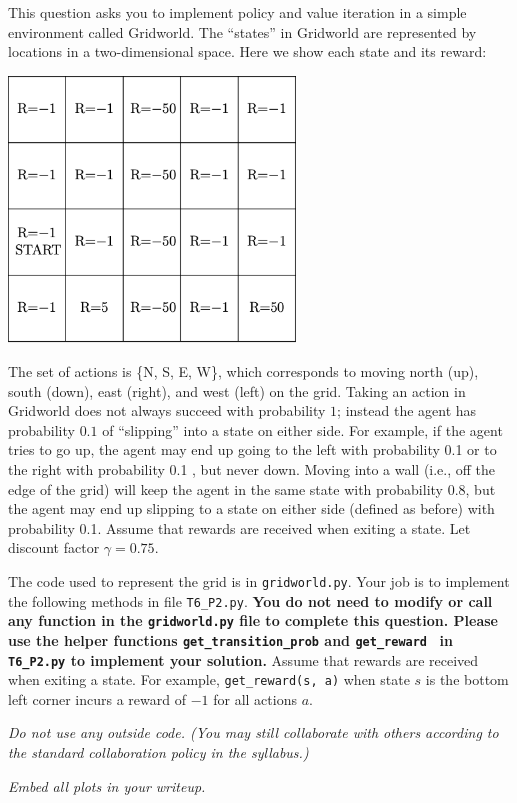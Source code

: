 \documentclass[submit]{harvardml}
\begin{document}
\begin{problem}

This question asks you to implement policy and value iteration in a
simple environment called Gridworld.  The ``states'' in Gridworld are
represented by locations in a two-dimensional space.  Here we show each state and its reward:

\begin{center}
\includegraphics[width=3in]{gridworld.png}
\end{center}

The set of actions is \{N, S, E, W\}, which corresponds to moving
north (up), south (down), east (right), and west (left) on the grid.
Taking an action in Gridworld does not always succeed with probability
$1$; instead the agent has probability $0.1$ of ``slipping'' into a
state on either side.  For example, if the agent tries to go up, the
agent may end up going to the left with probability 0.1 or
to the right
 with probability 0.1 , but never down.  Moving into a wall
(i.e., off the edge of the grid) will keep the agent in the same state
with probability  0.8, but
the agent may end up slipping to a state on either side (defined as before) with probability 0.1.  Assume that rewards are received when exiting a state. Let discount factor $\gamma = 0.75$.

The code used to represent the grid is in \texttt{gridworld.py}.  Your job is to implement the following methods in file \texttt{T6\_P2.py}. \textbf{You do not need to modify or call any function in the \texttt{gridworld.py} file to complete this question.  Please use the helper functions \texttt{get\_transition\_prob} and \texttt{get\_reward } in \texttt{T6\_P2.py} to implement your solution.} Assume that rewards are received when exiting a state.  For example, \texttt{get\_reward(s, a)} when state $s$ is the bottom left corner incurs a reward of $-1$ for all actions $a$.

\emph{Do not use any outside code.  (You may still collaborate with others according to the standard collaboration policy in the syllabus.)}  

\emph{Embed all plots in your writeup.}

\end{problem}
\newpage
\end{document}
